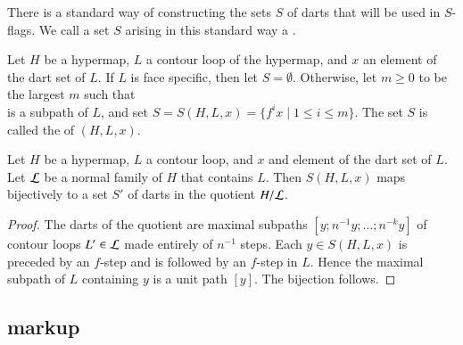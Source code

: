 There is a standard way of constructing the sets $S$ of darts that
will be used in $S$-flags.  We call a set $S$ arising in this
standard way a .

\begin{definition}
Let $H$ be a hypermap, $L$ a contour loop of the hypermap,
and $x$ an element of the dart set of $L$.
If  $L$ is  face specific, then let $S=\emptyset$.
Otherwise,
let $m\ge0$ to be the largest $m$ 
such that 
\begin{displaymath}
[x;f x; f^2 x;\ldots;f^{m+1} x]
\end{displaymath}  
is a subpath of $L$, and
set $S = S(H,L,x) = \{f^i x \mid 1 \le i\le m\}$.
The set $S$ is called the  of $(H,L,x)$.
\end{definition}

\begin{lemma}\label{lemma:flag-set-quotient}
Let $H$ be a hypermap, $L$ a contour loop, and $x$ and element of the dart set of $L$.
Let ${\cal L}$ be a normal family of $H$ that contains $L$.
Then $S(H,L,x)$ maps bijectively to a set $S'$ of darts in the quotient $H/{\cal L}$.
\end{lemma}

\begin{proof} The darts of the quotient are maximal subpaths $[y;n^{-1} y;\ldots;n^{-k} y]$
of contour loops $L'\in {\cal L}$ made entirely of $n^{-1}$ steps.  
Each $y\in S(H,L,x)$ is preceded by an $f$-step and is
followed by an $f$-step in $L$.  Hence the maximal subpath of $L$ containing $y$ 
is a unit path $[y]$.  The
bijection follows.
\end{proof}


\subsection{markup}\label{sec:face-insert}
%




